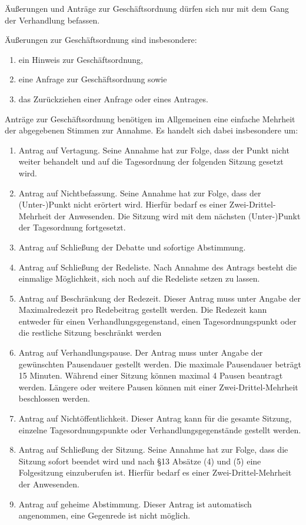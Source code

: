 \documentclass[10pt,a4paper]{scrartcl}
\begin{document}
\begin{contract}


\label{uxe4uuxdferungen-und-antruxe4ge-zur-geschuxe4ftsordnung}

Äußerungen und Anträge zur Geschäftsordnung dürfen sich nur mit dem
Gang der Verhandlung befassen.

Äußerungen zur Geschäftsordnung sind insbesondere:
\begin{enumerate}
	\item ein Hinweis zur Geschäftsordnung,
\item eine Anfrage zur Geschäftsordnung sowie 
\item das Zurückziehen einer Anfrage oder eines Antrages.
	\end{enumerate}

Anträge zur Geschäftsordnung benötigen im Allgemeinen eine einfache
Mehrheit der abgegebenen Stimmen zur Annahme. Es handelt sich dabei
insbesondere um:


\begin{enumerate}

\item
  Antrag auf Vertagung. Seine Annahme hat zur Folge, dass der Punkt
  nicht weiter behandelt und auf die Tagesordnung der folgenden Sitzung
  gesetzt wird.
\item
  Antrag auf Nichtbefassung. Seine Annahme hat zur Folge, dass der
  (Unter-)Punkt nicht erörtert wird. Hierfür bedarf es einer
  Zwei-Drittel-Mehrheit der Anwesenden. Die Sitzung wird mit dem
  nächsten (Unter-)Punkt der Tagesordnung fortgesetzt.
\item
  Antrag auf Schließung der Debatte und sofortige Abstimmung.
\item
  Antrag auf Schließung der Redeliste. Nach Annahme des Antrags besteht
  die einmalige Möglichkeit, sich noch auf die Redeliste setzen zu
  lassen.
\item
  Antrag auf Beschränkung der Redezeit. Dieser Antrag muss unter Angabe
  der Maximalredezeit pro Redebeitrag gestellt werden. Die
Redezeit kann entweder für einen Verhandlungsgegenstand, einen
Tagesordnungspunkt oder die restliche Sitzung beschränkt werden 
\item
	Antrag auf Verhandlungspause. Der Antrag muss unter Angabe der
gewünschten Pausendauer gestellt werden. Die maximale Pausendauer
beträgt 15 Minuten. Während einer Sitzung können maximal 4 Pausen
beantragt werden. Längere oder weitere Pausen können mit einer
Zwei-Drittel-Mehrheit beschlossen werden. 
\item
	Antrag auf
Nichtöffentlichkeit. Dieser Antrag kann für die gesamte Sitzung,
einzelne Tagesordnungspunkte oder Verhandlungsgegenstände gestellt
werden.
\item
	Antrag auf Schließung der Sitzung. Seine Annahme hat zur Folge, dass die
	Sitzung sofort beendet wird und nach §13 Absätze (4) und (5) eine Folgesitzung
	einzuberufen ist. Hierfür bedarf es einer Zwei-Drittel-Mehrheit der
	Anwesenden.
\item
	Antrag auf geheime Abstimmung.
Dieser Antrag ist automatisch angenommen, eine Gegenrede ist nicht
möglich.
\end{enumerate}


\end{contract}
\end{document}
